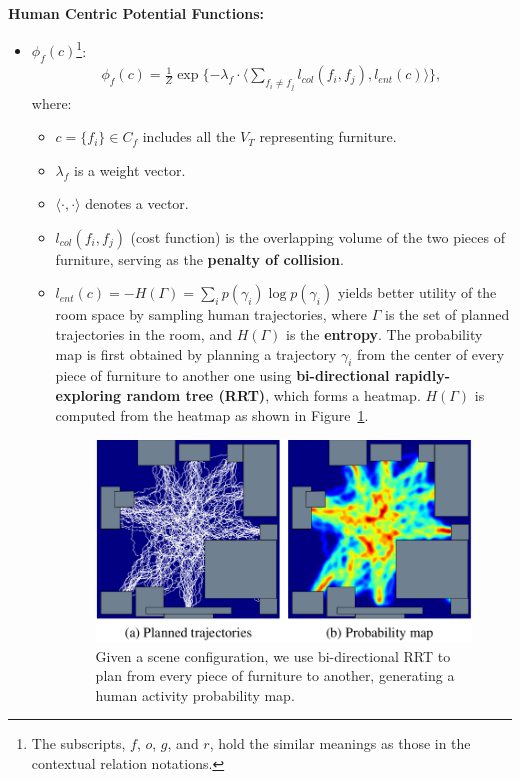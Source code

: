 \documentclass[10pt]{article}
\newcommand{\Fig}[1]{Figure~\ref{fig:#1}}
\begin{document}
\textbf{Human Centric Potential Functions:}
%
\begin{itemize}
  \item $\phi_f(c)$\footnote{The subscripts, $f$, $o$, $g$, and $r$, hold the
    similar meanings as those in the contextual relation notations.}:
    \begin{align}
      \label{eq:6}
      \phi_f(c) = \frac{1}{Z} \exp\{-\lambda_f \cdot \langle \sum_{f_i \neq f_j} l_{col}(f_i, f_j), l_{ent}(c) \rangle\},
    \end{align}
    where:
    \begin{itemize}
      \item $c = \{f_i\} \in C_f$ includes all the $V_T$ representing furniture.
      \item $\lambda_f$ is a weight vector.
      \item $\langle \cdot, \cdot \rangle$ denotes a vector.
      \item $l_{col}(f_i, f_j)$ (cost function) is the overlapping volume of
        the two pieces of furniture, serving as the \textbf{penalty of
        collision}.
      \item $l_{ent}(c) = -H(\Gamma) = \sum_i p(\gamma_i) \log p(\gamma_i)$
        yields better utility of the room space by sampling human trajectories,
        where $\Gamma$ is the set of planned trajectories in the room, and
        $H(\Gamma)$ is the \textbf{entropy}. The probability map is first
        obtained by planning a trajectory $\gamma_i$ from the center of every
        piece of furniture to another one using \textbf{bi-directional
        rapidly-exploring random tree (RRT)}, which forms a heatmap.
        $H(\Gamma)$ is computed from the heatmap as shown in \Fig{4}.
        \begin{figure}[!htpb]
          \centering
          \includegraphics[width=0.6\linewidth]{fig_4.png}
          \caption{Given a scene configuration, we use bi-directional RRT to
            plan from every piece of furniture to another, generating a human
            activity probability map.}%
          \label{fig:4}

\end{figure}
\end{itemize}
\end{itemize}
\end{document}
